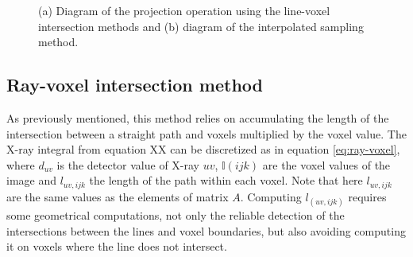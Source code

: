 \begin{figure}

\begin{center} 
 
\caption[Diagram of projection types]{\label{fig:Amatrix}(a) Diagram of the projection operation using the line-voxel intersection methods and (b) diagram of the interpolated sampling method.} 
\end{center} 
\end{figure}

\FloatBarrier

\subsection{Ray-voxel intersection method}

As previously mentioned, this method relies on accumulating the length of the intersection between a straight path and voxels multiplied by the voxel value. The X-ray integral from equation XX can be discretized as in equation \ref{eq:ray-voxel}, where $d_{uv}$ is the detector value of X-ray $uv$, $\mathbb{I}(ijk)$ are the voxel values of the image and $l_{uv,ijk}$ the length of the path within each voxel. Note that here $l_{uv,ijk}$ are the same values as the elements of matrix $A$. Computing $l_{(uv,ijk)}$ requires some geometrical computations, not only the reliable detection of the intersections between the lines and voxel boundaries, but also avoiding computing it on voxels where the line does not intersect.

